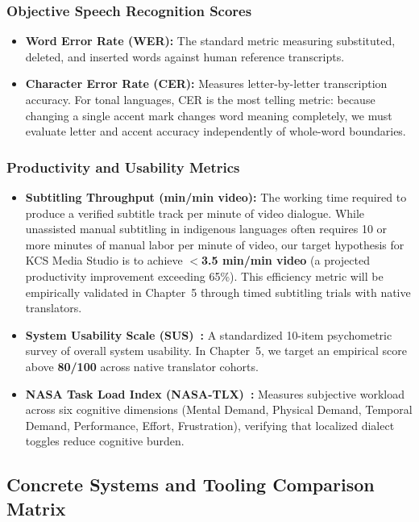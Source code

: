 \documentclass[a4paper,11pt]{article}
\begin{document}
\subsubsection{Objective Speech Recognition Scores}
\label{sec:chap2_obj_scores}
\begin{itemize}
    \item \textbf{Word Error Rate (WER):} The standard metric measuring substituted, deleted, and inserted words against human reference transcripts.
    \item \textbf{Character Error Rate (CER):} Measures letter-by-letter transcription accuracy. For tonal languages, CER is the most telling metric: because changing a single accent mark changes word meaning completely, we must evaluate letter and accent accuracy independently of whole-word boundaries.
\end{itemize}

\subsubsection{Productivity and Usability Metrics}
\label{sec:chap2_prod_metrics}
\begin{itemize}
    \item \textbf{Subtitling Throughput (min/min video):} The working time required to produce a verified subtitle track per minute of video dialogue. While unassisted manual subtitling in indigenous languages often requires 10 or more minutes of manual labor per minute of video, our target hypothesis for KCS Media Studio is to achieve \textbf{$<$3.5 min/min video} (a projected productivity improvement exceeding 65\%). This efficiency metric will be empirically validated in Chapter~5 through timed subtitling trials with native translators.
    \item \textbf{System Usability Scale (SUS)~\cite{brooke1996sus}:} A standardized 10-item psychometric survey of overall system usability. In Chapter~5, we target an empirical score above \textbf{80/100} across native translator cohorts.
    \item \textbf{NASA Task Load Index (NASA-TLX)~\cite{hart1988nasa}:} Measures subjective workload across six cognitive dimensions (Mental Demand, Physical Demand, Temporal Demand, Performance, Effort, Frustration), verifying that localized dialect toggles reduce cognitive burden.
\end{itemize}

\subsection{Concrete Systems and Tooling Comparison Matrix}
\label{sec:chap2_system_matrix}
\end{document}

